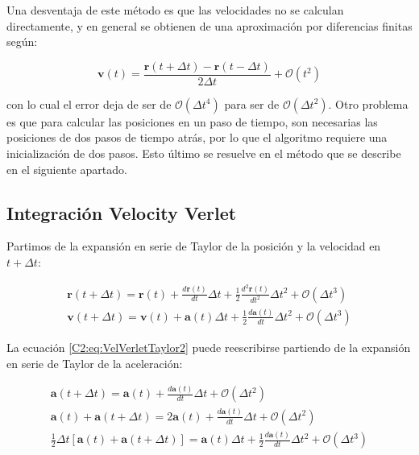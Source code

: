 Una desventaja de este método es que las velocidades no se calculan directamente, y en general se obtienen de una aproximación por diferencias finitas según:

\begin{equation}
\mathbf{v}(t) = \frac{\mathbf{r}(t+\Delta{}t) - \mathbf{r}(t-\Delta{}t)}{2\Delta{}t} + \mathcal{O}(t^{2})
\end{equation}

con lo cual el error deja de ser de $\mathcal{O}(\Delta{}t^{4})$ para ser de $\mathcal{O}(\Delta{}t^{2})$. Otro problema es que para calcular las posiciones en un paso de tiempo, son necesarias las posiciones de dos pasos de tiempo atrás, por lo que el algoritmo requiere una inicialización de dos pasos. Esto último se resuelve en el método que se describe en el siguiente apartado.

\subsection{Integración Velocity Verlet}
\label{S2_4_2}

Partimos de la expansión en serie de Taylor de la posición y la velocidad en $t+\Delta{}t$:

\begin{eqnarray}
\mathbf{r}(t+\Delta{}t) = \mathbf{r}(t)+\frac{d\mathbf{r}(t)}{dt} \Delta{}t + \frac{1}{2} \frac{d^{2}\mathbf{r}(t)}{dt^{2}} \Delta{}t^{2} + \mathcal{O}(\Delta{}t^{3})
\label{C2:eq:VelVerletTaylor1} \\
\mathbf{v}(t+\Delta{}t) = \mathbf{v}(t)+\mathbf{a}(t)\Delta{}t + \frac{1}{2}\frac{d\mathbf{a}(t)}{dt} \Delta{}t^{2} + \mathcal{O}(\Delta{}t^{3})
\label{C2:eq:VelVerletTaylor2}
\end{eqnarray}

La ecuación \ref{C2:eq:VelVerletTaylor2} puede reescribirse partiendo de la expansión en serie de Taylor de la aceleración:

\begin{eqnarray}
\mathbf{a}(t+\Delta{}t) = \mathbf{a}(t)+\frac{d\mathbf{a}(t)}{dt} \Delta{}t + \mathcal{O}(\Delta{}t^{2})
\label{C2:eq:tayloracc1} \\
\mathbf{a}(t)+\mathbf{a}(t+\Delta{}t) = 2\mathbf{a}(t)+\frac{d\mathbf{a}(t)}{dt} \Delta{}t + \mathcal{O}(\Delta{}t^{2})
\label{C2:eq:tayloracc2} \\
\frac{1}{2}\Delta{}t\left[\mathbf{a}(t)+\mathbf{a}(t+\Delta{}t)\right] = \mathbf{a}(t)\Delta{}t+\frac{1}{2}\frac{d\mathbf{a}(t)}{dt} \Delta{}t^{2} + \mathcal{O}(\Delta{}t^{3})
\label{C2:eq:tayloracc3}
\end{eqnarray}

